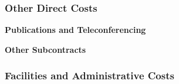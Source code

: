    \subsubsection{Other Direct Costs} 

{\bf Publications and Teleconferencing} \hspace{0.1in} 


{\bf Other Subcontracts} \hspace{0.1in} 

   \subsubsection{Facilities and Administrative Costs} 




